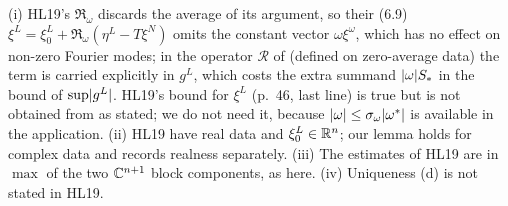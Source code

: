 \begin{remark}\label{bpI:p1:border-remarks}
(i) HL19's $\mathfrak R_\omega$ discards the average of its argument, so their (6.9) $\xi^L=\xi^L_0+\mathfrak R_\omega(\eta^L-T\xi^N)$ omits the
constant vector $\omega\xi^\omega$, which has no effect on non-zero Fourier modes; in the operator $\mathcal R$ of
 (defined on zero-average data) the term is carried explicitly in $g^L$, which costs the extra summand
$\lvert \omega\rvert S_*$ in the bound of $\sup\lvert g^L\rvert$. HL19's bound for $\xi^L$ (p.~46, last line) is true but is not obtained from 
as stated; we do not need it, because $\lvert \omega\rvert\le\sigma_\omega\lvert \omega^*\rvert$ is available in the application. (ii) HL19 have real data
and $\xi^L_0\in\mathbb{R}^n$; our lemma holds for complex data and records realness separately. (iii) The estimates of HL19 are in $\max$ of the two
$\mathbb{C}^{n+1}$ block components, as here. (iv) Uniqueness (d) is not stated in HL19.
\end{remark}

